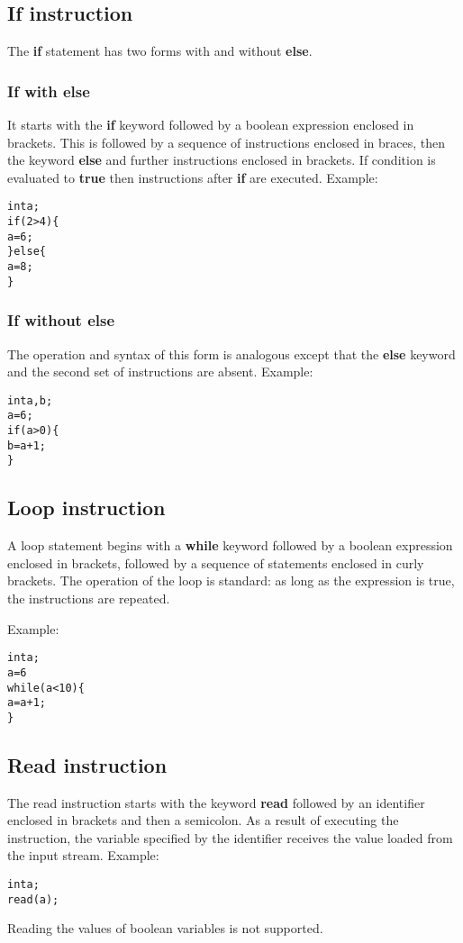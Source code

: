 \documentclass{ol-softwaremanual}
\begin{document}
\subsection{If instruction}
The \textbf{if} statement has two forms with and without \textbf{else}.
\subsubsection{If with else}
It starts with the \textbf{if} keyword followed by a boolean expression enclosed in brackets. This is followed by a sequence of instructions enclosed in braces, then the keyword \textbf{else} and further instructions enclosed in brackets.
If condition is evaluated to \textbf{true} then instructions after \textbf{if} are executed.
Example:
\begin{alltt}
int a;
if(2 > 4)\{
a = 6;
\} else\{
a = 8;
\}
\end{alltt}
\subsubsection{If without else}
The operation and syntax of this form is analogous except that the \textbf{else} keyword and the second set of instructions are absent.
Example:
\begin{alltt}
int a, b;
a=6;
if(a > 0)\{
b= a +1;
\} 
\end{alltt}

\subsection{Loop instruction}
A loop statement begins with a \textbf{while} keyword followed by a boolean expression enclosed in brackets, followed by a sequence of statements enclosed in curly brackets. The operation of the loop is standard: as long as the expression is true, the instructions are repeated.

Example:
\begin{alltt}
int a;
a=6
while(a <10)\{
a= a +1;
\} 
\end{alltt}

\subsection{Read instruction}
The read instruction starts with the keyword \textbf{read} followed by an identifier enclosed in brackets and then a semicolon. As a result of executing the instruction, the variable specified by the identifier receives the value loaded from the input stream.
Example:
\begin{alltt}
int a;
read(a); 
\end{alltt}
Reading the values of boolean variables is not supported.
\end{document}
